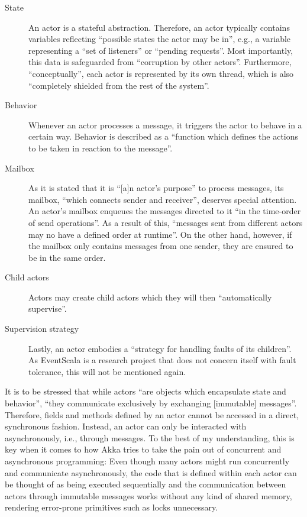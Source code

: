 \documentclass[article, type=bsc, colorback, accentcolor=tud8b, parskip=half, bibliography=totocnumbered]{tudthesis}
\begin{document}
\begin{description}

\item[State]
An actor is a stateful abstraction.
Therefore, an actor typically contains variables reflecting ``possible states the actor may be in'', e.g., a variable representing a ``set of listeners'' or ``pending requests''.
Most importantly, this data is safeguarded from ``corruption by other actors''.
Furthermore, ``conceptually'', each actor is represented by its own thread, which is also ``completely shielded from the rest of the system''.

\item[Behavior]
Whenever an actor processes a message, it triggers the actor to behave in a certain way.
Behavior is described as a ``function which defines the actions to be taken in reaction to the message''.

\item[Mailbox]
As it is stated that it is ``[a]n actor's purpose'' to process messages, its mailbox, ``which connects sender and receiver'', deserves special attention.
An actor's mailbox enqueues the messages directed to it ``in the time-order of send operations''.
As a result of this, ``messages sent from different actors may no have a defined order at runtime''.
On the other hand, however, if the mailbox only contains messages from one sender, they are ensured to be in the same order.

\item[Child actors]
Actors may create child actors which they will then ``automatically supervise''.

\item[Supervision strategy]
Lastly, an actor embodies a ``strategy for handling faults of its children''.
As EventScala is a research project that does not concern itself with fault tolerance, this will not be mentioned again.

\end{description}

It is to be stressed that while actors ``are objects which encapsulate state and behavior'', ``they communicate exclusively by exchanging [immutable] messages''.
Therefore, fields and methods defined by an actor cannot be accessed in a direct, synchronous fashion.
Instead, an actor can only be interacted with asynchronously, i.e., through messages.
To the best of my understanding, this is key when it comes to how Akka tries to take the pain out of concurrent and asynchronous programming:
Even though many actors might run concurrently and communicate asynchronously, the code that is defined within each actor can be thought of as being executed sequentially and the communication between actors through immutable messages works without any kind of shared memory, rendering error-prone primitives such as locks unnecessary.
\end{document}
